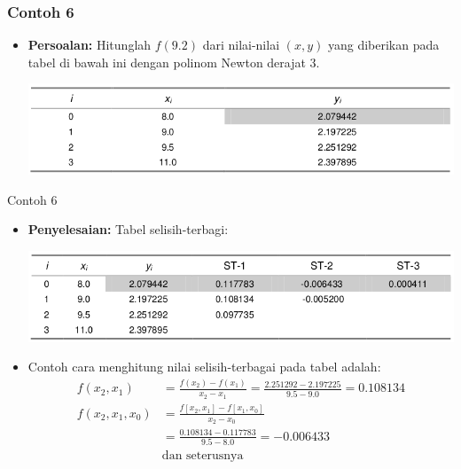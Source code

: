 \documentclass[pdflatex,compress,mathserif]{beamer}
\begin{document}
\begin{frame}
	\frametitle{Contoh 6}
	\begin{itemize}
		\item \textbf{Persoalan:} Hitunglah $ f(9.2) $ dari nilai-nilai $ (x, y) $ yang diberikan pada tabel di bawah ini dengan polinom Newton derajat 3.
		\begin{center}
			\includegraphics[width=\linewidth]{img/img12}
		\end{center}
	\end{itemize}
\end{frame}

\begin{frame}{Contoh 6}
	\begin{itemize}
		\item \textbf{Penyelesaian:} Tabel selisih-terbagi:
		\begin{center}
			\includegraphics[width=\linewidth]{img/img13}
		\end{center}
		\item Contoh cara menghitung nilai selisih-terbagai pada tabel adalah:
		\begin{align*}
			f(x_2, x_1) &= \frac{f(x_2) - f(x_1)}{x_2 - x_1} = \frac{2.251292 - 2.197225}{9.5 - 9.0} = 0.108134 \\
			f(x_2, x_1, x_0) &= \frac{f[x_2,x_1] - f[x_1,x_0]}{x_2 - x_0}\\
			&= \frac{0.108134 - 0.117783}{9.5 - 8.0} = -0.006433 \\
			&\text{dan seterusnya}
		\end{align*}
	\end{itemize}
\end{frame}
\end{document}
